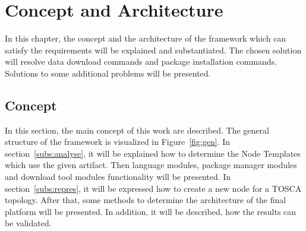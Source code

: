 
\chapter{Concept and Architecture}\label{chap:conarch}
In this chapter, the concept and the architecture of the framework which can satisfy the requirements will be explained and substantiated.
The chosen solution will resolve data download commands and package installation commands.
Solutions to some additional problems will be presented. 
\section{Concept}
In this section, the main concept of this work are described.
The general structure of the framework is visualized in Figure~\ref{fig:gen}. 
In section~\ref{subs:analyse}, it will be explained how to determine the Node Templates which use the given artifact.
Then language modules, package manager modules and download tool modules functionality will be presented.
In section~\ref{subs:repres}, it will be expressed how to create a new node for a TOSCA topology. 
After that, some methods to determine the architecture of the final platform will be presented.
In addition, it will be described, how the results can be validated.


